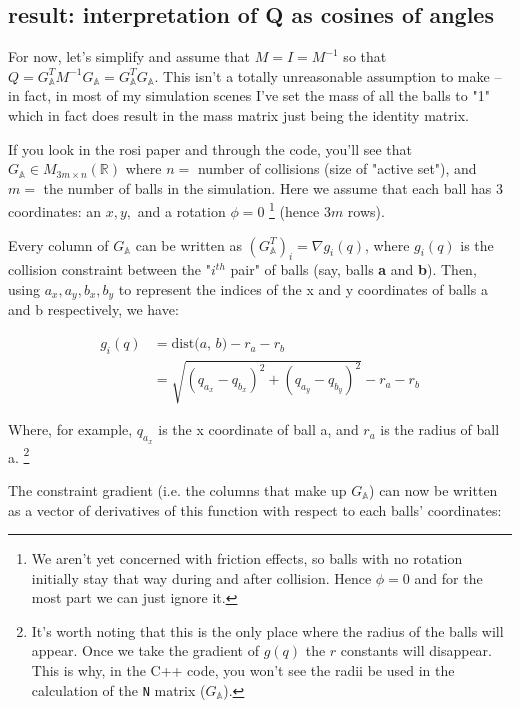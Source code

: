 \documentclass[12pt]{article}
\newcommand{\GA}{G_{\mathbb{A}}}
\newcommand{\dist}[2]{\text{dist(} #1 \text{, } #2 \text{)}}
\begin{document}
\subsection{result: interpretation of Q as cosines of angles}

For now, let's simplify and assume that $M = I = M^{-1}$
so that $Q = \GA^T M^{-1} \GA = \GA^T \GA$.
This isn't a totally unreasonable assumption to make -- in fact, in most of my simulation scenes
I've set the mass of all the balls to "1" which in fact does result in the mass matrix just being the identity matrix.

If you look in the rosi paper and through the code, you'll see that $\GA \in M_{3m \times n}(\mathbb{R})$
where $n = $ number of collisions (size of "active set"),
and $m = $ the number of balls in the simulation.
Here we assume that each ball has 3 coordinates: an $x, y,$ and a rotation $\phi = 0$
\footnote{
    We aren't yet concerned with friction effects,
    so balls with no rotation initially stay that way during and after collision.
    Hence $\phi = 0$ and for the most part we can just ignore it.
}
(hence $3m$ rows).

Every column of $\GA$ can be written as $(\GA^T)_i = \nabla g_i(q)$, where $g_i(q)$
is the collision constraint between the "$i^{th}$ pair" of balls (say, balls \textbf{a} and \textbf{b}).
Then, using $a_x, a_y, b_x, b_y$ to represent the indices of the x and y coordinates
of balls a and b respectively, we have:

\begin{align*}
    g_i(q)  &= \dist{a}{b} - r_a - r_b\\
            &= \sqrt{(q_{a_x} - q_{b_x})^2 + (q_{a_y} - q_{b_y})^2} - r_a - r_b
\end{align*}

Where, for example, $q_{a_x}$ is the x coordinate of ball a, and $r_a$ is the radius of ball a.
\footnote{
    It's worth noting that this is
    the only place where the radius of the balls will appear. Once we take the gradient of $g(q)$
    the $r$ constants will disappear.
    This is why, in the C++ code, you won't see the radii be used in the calculation of the \texttt{N} matrix ($\GA$).
}

The constraint gradient (i.e. the columns that make up $\GA$) can now be written as a vector of derivatives of this function
with respect to each balls' coordinates:
\end{document}
